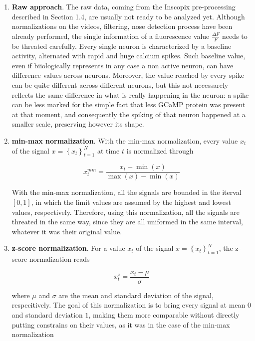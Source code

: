 \documentclass[a4paper]{article}
\begin{document}
\begin{enumerate}
	
	\item \textbf{Raw approach}. The raw data, coming from the Inscopix pre-processing described in Section 1.4, are usually not ready to be analyzed yet. Although normalizations on the videos, filtering, nose detection process have been already performed, the single information of a fluorescence value $\frac{\Delta F}{F}$ needs to be threated carefully. Every single neuron is characterized by a baseline activity, alternated with rapid and huge calcium spikes. Such baseline value, even if biiologically represents in any case a non active neuron, can have difference values across neurons. Moreover, the value reached by every spike can be quite different across different neurons, but this not necessarely reflects the same difference in what is really happening in the neuron: a spike can be less marked for the simple fact that less GCaMP protein was present at that moment, and consequently the spiking of that neuron happened at a smaller scale, preserving however its shape. 
	
	\item \textbf{min-max normalization}. With the min-max normalization, every value $x_t$ of the signal $ x = \left\{ x_t\right\}_{t=1}^N$ at time $t$ is normalized through
	
	\begin{equation}
	x_t^{mm} = \frac{x_t -  \min(x)}{\max(x) - \min(x)}
	\end{equation}
	
	With the min-max normalization, all the signals are bounded in the iterval $[0,1]$, in which the limit values are assumed by the highest and lowest values, respectively. Therefore, using this normalization, all the signals are threated in the same way, since they are all uniformed in the same interval, whatever it was their original value.
	
	\item \textbf{z-score normalization}. For a value  $x_t$ of the signal $ x = \left\{ x_t\right\}_{t=1}^N$, the z-score normalization reads
	
	\begin{equation}
	x_t^{z} = \frac{x_t -  \mu}{\sigma}
	\end{equation}
	
	where $\mu$ and $\sigma$ are the mean and standard deviation of the signal, respecitively. The goal of this normalization is to bring every signal at mean $0$ and standard deviation $1$, making them more comparable without directly putting constrains on their values, as it was in the case of the min-max normalization
	
	
\end{enumerate}
\end{document}
